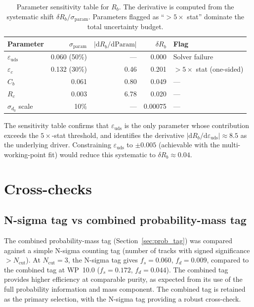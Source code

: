 \documentclass[11pt,a4paper]{article}
\begin{document}
\begin{table}[htbp]
\centering
\caption{Parameter sensitivity table for $R_b$. The derivative is computed from the
systematic shift $\delta R_b / \sigma_\mathrm{param}$. Parameters flagged as
``$> 5\times$ stat'' dominate the total uncertainty budget.}
\label{tab:sensitivity}
\small
\begin{tabular}{lrrrl}
\toprule
Parameter & $\sigma_\mathrm{param}$ & $|\mathrm{d}R_b/\mathrm{d}\mathrm{Param}|$ & $\delta R_b$ & Flag \\
\midrule
$\varepsilon_\mathrm{uds}$ & 0.060 (50\%) & --- & 0.000 & Solver failure \\
$\varepsilon_c$ & 0.132 (30\%) & 0.46 & 0.201 & $> 5\times$ stat (one-sided) \\
$C_b$ & 0.061 & 0.80 & 0.049 & --- \\
$R_c$ & 0.003 & 6.78 & 0.020 & --- \\
$\sigma_{d_0}$ scale & 10\% & --- & 0.00075 & --- \\
\bottomrule
\end{tabular}
\end{table}

The sensitivity table confirms that $\varepsilon_\mathrm{uds}$ is the only parameter
whose contribution exceeds the $5\times$-stat threshold, and identifies the derivative
$|\mathrm{d}R_b/\mathrm{d}\varepsilon_\mathrm{uds}| \approx 8.5$ as the underlying
driver. Constraining $\varepsilon_\mathrm{uds}$ to $\pm 0.005$ (achievable with the
multi-working-point fit) would reduce this systematic to $\delta R_b \approx 0.04$.

\FloatBarrier
{}
\section{Cross-checks}
\label{sec:crosschecks}

\subsection{N-sigma tag vs combined probability-mass tag}
\label{sec:xcheck_nsigma}

The combined probability-mass tag (Section~\ref{sec:prob_tag}) was compared against
a simple N-sigma counting tag (number of tracks with signed significance $> N_\mathrm{cut}$).
At $N_\mathrm{cut} = 3$, the N-sigma tag gives $f_s = 0.060$, $f_d = 0.009$, compared
to the combined tag at WP~10.0 ($f_s = 0.172$, $f_d = 0.044$). The combined tag
provides higher efficiency at comparable purity, as expected from its use of the full
probability information and mass component. The combined tag is retained as the primary
selection, with the N-sigma tag providing a robust cross-check.
\end{document}
